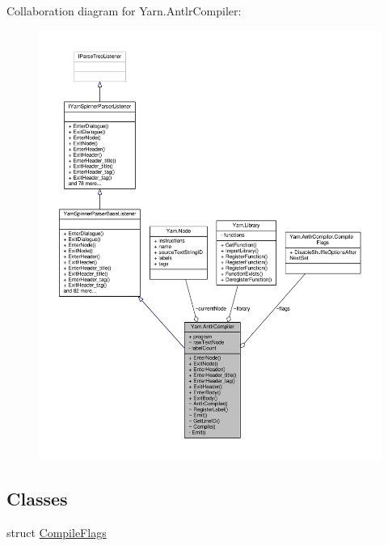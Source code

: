 Collaboration diagram for Yarn.\-Antlr\-Compiler\-:
\nopagebreak
\begin{figure}[H]
\begin{center}
\leavevmode
\includegraphics[width=350pt]{a00592}
\end{center}
\end{figure}
\subsection*{Classes}
\begin{DoxyCompactItemize}
\item 
struct \hyperlink{a00038_a00374}{Compile\-Flags}
\end{DoxyCompactItemize}
